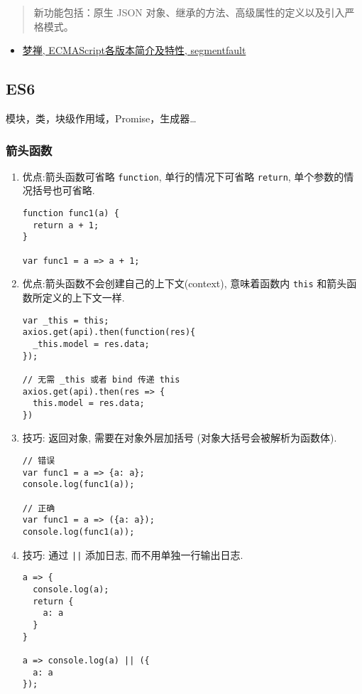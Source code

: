\begin{quote}
新功能包括：原生 JSON 对象、继承的方法、高级属性的定义以及引入严格模式。
\end{quote}

\begin{itemize}
\tightlist
\item
  \href{http://segmentfault.com/a/1190000003493604}{梦禅,
  ECMAScript各版本简介及特性, segmentfault}
\end{itemize}

\subsection{ES6}\label{es6}

模块，类，块级作用域，Promise，生成器\ldots{}

\subsubsection{箭头函数}\label{ux7badux5934ux51fdux6570}

\begin{enumerate}
\def\labelenumi{\arabic{enumi}.}
\item
  优点:箭头函数可省略 \lstinline!function!, 单行的情况下可省略
  \lstinline!return!, 单个参数的情况括号也可省略.

\begin{lstlisting}
function func1(a) {
  return a + 1;
}

var func1 = a => a + 1;
\end{lstlisting}
\item
  优点:箭头函数不会创建自己的上下文(context), 意味着函数内
  \lstinline!this! 和箭头函数所定义的上下文一样.

\begin{lstlisting}
var _this = this;
axios.get(api).then(function(res){
  _this.model = res.data;
});

// 无需 _this 或者 bind 传递 this
axios.get(api).then(res => {
  this.model = res.data;
})
\end{lstlisting}
\item
  技巧: 返回对象, 需要在对象外层加括号 (对象大括号会被解析为函数体).

\begin{lstlisting}
// 错误
var func1 = a => {a: a};
console.log(func1(a));

// 正确
var func1 = a => ({a: a});
console.log(func1(a));
\end{lstlisting}
\item
  技巧: 通过 \lstinline!||! 添加日志, 而不用单独一行输出日志.

\begin{lstlisting}
a => {
  console.log(a);
  return {
    a: a
  }
}

a => console.log(a) || ({
  a: a
});
\end{lstlisting}
\end{enumerate}

